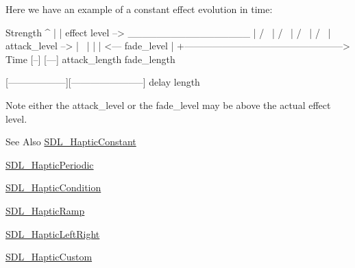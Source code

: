 Here we have an example of a constant effect evolution in time\-: \begin{DoxyVerb}   Strength
   ^
   |
   |    effect level -->  _________________
   |                     /                 \
   |                    /                   \
   |                   /                     \
   |                  /                       \
   | attack_level --> |                        \
   |                  |                        |  <---  fade_level
   |
   +--------------------------------------------------> Time
                      [--]                 [---]
                      attack_length        fade_length

   [------------------][-----------------------]
   delay               length\end{DoxyVerb}


Note either the attack\-\_\-level or the fade\-\_\-level may be above the actual effect level.

\begin{DoxySeeAlso}{See Also}
\hyperlink{struct_s_d_l___haptic_constant}{S\-D\-L\-\_\-\-Haptic\-Constant} 

\hyperlink{struct_s_d_l___haptic_periodic}{S\-D\-L\-\_\-\-Haptic\-Periodic} 

\hyperlink{struct_s_d_l___haptic_condition}{S\-D\-L\-\_\-\-Haptic\-Condition} 

\hyperlink{struct_s_d_l___haptic_ramp}{S\-D\-L\-\_\-\-Haptic\-Ramp} 

\hyperlink{struct_s_d_l___haptic_left_right}{S\-D\-L\-\_\-\-Haptic\-Left\-Right} 

\hyperlink{struct_s_d_l___haptic_custom}{S\-D\-L\-\_\-\-Haptic\-Custom} 
\end{DoxySeeAlso}


